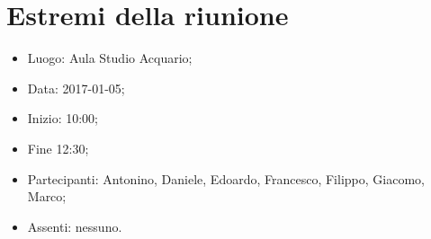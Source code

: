\documentclass[../verbale-2017-01-05.tex]{subfiles}
\begin{document}
\section{Estremi della riunione}
	\begin{itemize}
		\item Luogo: Aula Studio Acquario;
        \item Data: 2017-01-05;
        \item Inizio: 10:00;
        \item Fine 12:30;
		  \item Partecipanti: Antonino, Daniele, Edoardo, Francesco, Filippo, Giacomo, Marco;
        \item Assenti: nessuno.
	\end{itemize}
\end{document}
